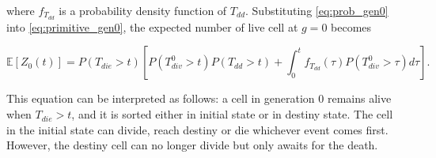 \documentclass[11pt, a4paper]{article}
\begin{document}
where $f_{T_{dd}}$ is a probability density function of $T_{dd}$. Substituting \cref{eq:prob_gen0} into \cref{eq:primitive_gen0}, the expected number of live cell at $g=0$ becomes
\begin{linenomath*}
    \begin{equation}
        \label{eq:final_gen0}
        \mathbb{E}[Z_0(t)] = P(T_{die} > t)\left[P(T_{div}^0 > t)P(T_{dd} > t)  + \int_0^t f_{T_{dd}}(\tau) P(T_{div}^0 > \tau)d\tau\right].
    \end{equation}
\end{linenomath*}
This equation can be interpreted as follows: a cell in generation 0 remains alive when $T_{die} > t$, and it is sorted either in initial state or in destiny state. The cell in the initial state can divide, reach destiny or die whichever event comes first. However, the destiny cell can no longer divide but only awaits for the death.

\nolinenumbers
\end{document}
